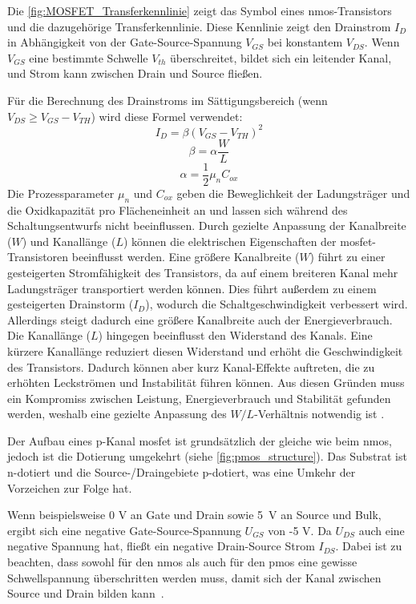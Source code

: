 Die \autoref{fig:MOSFET_Transferkennlinie} zeigt das Symbol eines \gls{nmos}-Transistors und die dazugehörige Transferkennlinie. Diese Kennlinie zeigt den Drainstrom $I_D$ in Abhängigkeit von der Gate-Source-Spannung $V_{GS}$ bei konstantem $V_{DS}$. Wenn $V_{GS}$ eine bestimmte Schwelle $V_{th}$ überschreitet, bildet sich ein leitender Kanal, und Strom kann zwischen Drain und Source fließen.

Für die Berechnung des Drainstroms im Sättigungsbereich (wenn $V_{DS} \geq V_{GS} - V_{TH}$) wird diese Formel verwendet: 
\begin{equation}
    I_D = \beta (V_{GS} - V_{TH})^2
\end{equation}
\begin{equation}
    \beta = \alpha \frac{W}{L}
\end{equation}
\begin{equation}
    \alpha = \frac{1}{2} \mu_n C_{ox}
\end{equation}
Die Prozessparameter $\mu_n$ und $C_{ox}$ geben die Beweglichkeit der Ladungsträger und die Oxidkapazität pro Flächeneinheit an und lassen sich während des Schaltungsentwurfs nicht beeinflussen. Durch gezielte Anpassung der Kanalbreite ($W$) und Kanallänge ($L$) können die elektrischen Eigenschaften der \gls{mosfet}-Transistoren beeinflusst werden. Eine größere Kanalbreite ($W$) führt zu einer gesteigerten Stromfähigkeit des Transistors, da auf einem breiteren Kanal mehr Ladungsträger transportiert werden können. Dies führt außerdem zu einem gesteigerten Drainstorm ($I_D$), wodurch die Schaltgeschwindigkeit verbessert wird. Allerdings steigt dadurch eine größere Kanalbreite auch der Energieverbrauch. Die Kanallänge ($L$) hingegen beeinflusst den Widerstand des Kanals. Eine kürzere Kanallänge reduziert diesen Widerstand und erhöht die Geschwindigkeit des Transistors. Dadurch können aber kurz Kanal-Effekte auftreten, die zu erhöhten Leckströmen und Instabilität führen können. Aus diesen Gründen muss ein Kompromiss zwischen Leistung, Energieverbrauch und Stabilität gefunden werden, weshalb eine gezielte Anpassung des $W/L$-Verhältnis notwendig ist \cite{MicroelectronicCircuits}.
    
Der Aufbau eines p-Kanal \gls{mosfet} ist grundsätzlich der gleiche wie beim \gls{nmos}, jedoch ist die Dotierung umgekehrt (siehe \autoref{fig:pmos_structure}). Das Substrat ist n-dotiert und die \mbox{Source-/Draingebiete} p-dotiert, was eine Umkehr der Vorzeichen zur Folge hat. 

Wenn beispielsweise 0 V an Gate und Drain sowie 5~V an Source und Bulk, ergibt sich eine negative Gate-Source-Spannung $U_{GS}$ von -5 V. Da $U_{DS}$ auch eine negative Spannung hat, fließt ein negative Drain-Source Strom $I_{DS}$. Dabei ist zu beachten, dass sowohl für den \gls{nmos} als auch für den \gls{pmos} eine gewisse Schwellspannung überschritten werden muss, damit sich der Kanal zwischen Source und Drain bilden kann~\cite{Göbel2019}.  

